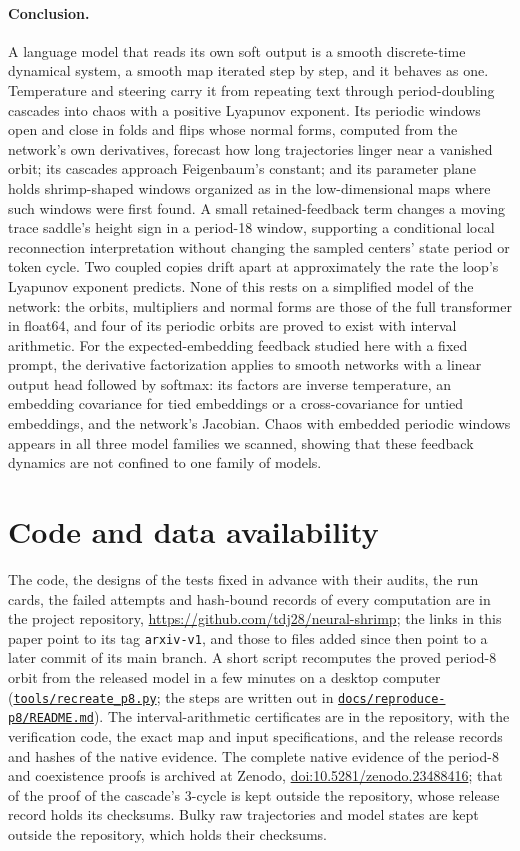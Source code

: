 \documentclass[11pt,letterpaper]{article}
\newcommand{\repourl}{https://github.com/tdj28/neural-shrimp}
\newcommand{\laterrepo}[1]{\href{\repourl/blob/0399fee2e9537a50993482aea8ec417e70286ac4/#1}{\nolinkurl{#1}}}
\begin{document}
\paragraph{Conclusion.} A language model that reads its own soft output is a smooth discrete-time dynamical system, a smooth map iterated
step by step, and it behaves as one. Temperature and steering carry it from repeating text through period-doubling cascades into chaos with a positive
Lyapunov exponent. Its periodic windows open and close in folds and flips whose normal forms, computed from the
network's own derivatives, forecast how long trajectories linger near a vanished orbit; its cascades approach
Feigenbaum's constant; and its parameter plane holds shrimp-shaped windows organized as in the low-dimensional maps
where such windows were first found. A small retained-feedback term changes a moving trace saddle's height sign
in a period-18 window, supporting a conditional local reconnection interpretation without changing the sampled
centers' state period or token cycle. Two coupled copies drift apart at approximately the rate the loop's Lyapunov exponent predicts.
None of this rests on a simplified model of the network: the orbits, multipliers and normal forms are those of the full
transformer in float64, and four of its periodic orbits are proved to exist with interval arithmetic. For the expected-embedding
feedback studied here with a fixed prompt, the derivative factorization applies to smooth networks with a linear output
head followed by softmax: its factors are inverse temperature, an embedding covariance for tied embeddings or a
cross-covariance for untied embeddings, and the network's Jacobian. Chaos with embedded periodic windows appears in all
three model families we scanned, showing that these feedback dynamics are not confined to one family of models.

\section*{Code and data availability}
The code, the designs of the tests fixed in advance with their audits, the run cards, the failed attempts and
hash-bound records of every computation are in the project repository, \url{https://github.com/tdj28/neural-shrimp};
the links in this paper point to its tag \texttt{arxiv-v1}, and those to files added since then point to a later
commit of its main branch. A short script recomputes the proved period-8 orbit from the released model in a few
minutes on a desktop computer (\laterrepo{tools/recreate_p8.py}; the steps are written out in
\laterrepo{docs/reproduce-p8/README.md}). The interval-arithmetic certificates are in the
repository, with the verification code, the exact map and input specifications, and the release records and hashes of
the native evidence. The complete native evidence of the period-8 and coexistence proofs is archived at Zenodo,
\href{https://doi.org/10.5281/zenodo.23488416}{doi:10.5281/zenodo.23488416}; that of the proof of the cascade's
3-cycle is kept outside the repository, whose release record holds its checksums. Bulky raw trajectories and model states
are kept outside the repository, which holds their checksums.
\end{document}
